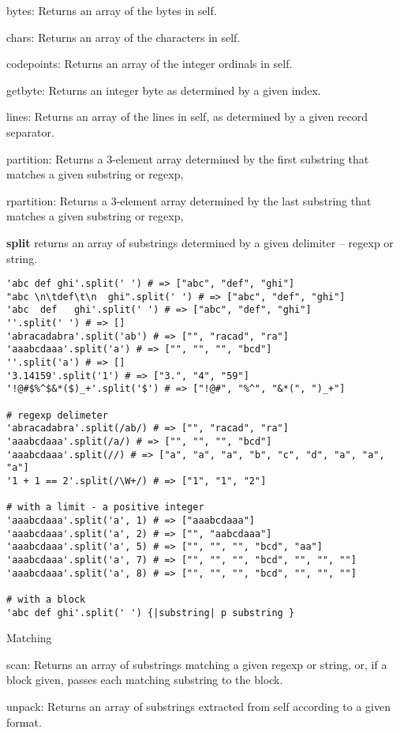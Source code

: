 bytes: Returns an array of the bytes in self.

chars: Returns an array of the characters in self.

codepoints: Returns an array of the integer ordinals in self.

getbyte: Returns an integer byte as determined by a given index.


lines: Returns an array of the lines in self, as determined by a given record separator.

partition: Returns a 3-element array determined by the first substring that matches a given substring or regexp,

rpartition: Returns a 3-element array determined by the last substring that matches a given substring or regexp,

\textbf{split} returns an array of substrings determined by a given delimiter – regexp or string.
\begin{verbatim}
'abc def ghi'.split(' ') # => ["abc", "def", "ghi"]
"abc \n\tdef\t\n  ghi".split(' ') # => ["abc", "def", "ghi"]
'abc  def   ghi'.split(' ') # => ["abc", "def", "ghi"]
''.split(' ') # => []
'abracadabra'.split('ab') # => ["", "racad", "ra"]
'aaabcdaaa'.split('a') # => ["", "", "", "bcd"]
''.split('a') # => []
'3.14159'.split('1') # => ["3.", "4", "59"]
'!@#$%^$&*($)_+'.split('$') # => ["!@#", "%^", "&*(", ")_+"]

# regexp delimeter
'abracadabra'.split(/ab/) # => ["", "racad", "ra"]
'aaabcdaaa'.split(/a/) # => ["", "", "", "bcd"]
'aaabcdaaa'.split(//) # => ["a", "a", "a", "b", "c", "d", "a", "a", "a"]
'1 + 1 == 2'.split(/\W+/) # => ["1", "1", "2"]

# with a limit - a positive integer
'aaabcdaaa'.split('a', 1) # => ["aaabcdaaa"]
'aaabcdaaa'.split('a', 2) # => ["", "aabcdaaa"]
'aaabcdaaa'.split('a', 5) # => ["", "", "", "bcd", "aa"]
'aaabcdaaa'.split('a', 7) # => ["", "", "", "bcd", "", "", ""]
'aaabcdaaa'.split('a', 8) # => ["", "", "", "bcd", "", "", ""]

# with a block
'abc def ghi'.split(' ') {|substring| p substring }
\end{verbatim}

Matching

scan: Returns an array of substrings matching a given regexp or string, or, if a block given, passes each matching substring to the block.

unpack: Returns an array of substrings extracted from self according to a given format.

